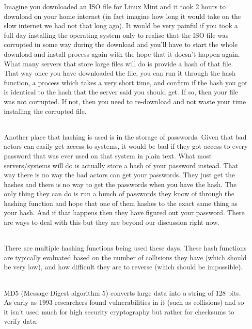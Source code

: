 \documentclass[
  letterpaper,
  DIV=11,
  numbers=noendperiod]{scrartcl}
\newenvironment{Shaded}{\begin{snugshade}}{\end{snugshade}}
\newcommand{\NormalTok}[1]{\textcolor[rgb]{0.00,0.23,0.31}{#1}}
\begin{document}
Imagine you downloaded an ISO file for Linux Mint and it took 2 hours to
download on your home internet (in fact imagine how long it would take
on the slow internet we had not that long ago). It would be very painful
if you took a full day installing the operating system only to realise
that the ISO file was corrupted in some way during the download and
you'll have to start the whole download and install process again with
the hope that it doesn't happen again. What many servers that store
large files will do is provide a hash of that file. That way once you
have downloaded the file, you can run it through the hash function, a
process which takes a very short time, and confirm if the hash you got
is identical to the hash that the server said you should get. If so,
then your file was not corrupted. If not, then you need to re-download
and not waste your time installing the corrupted file.\\
\strut \\
Another place that hashing is used is in the storage of passwords. Given
that bad actors can easily get access to systems, it would be bad if
they got access to every password that was ever used on that system in
plain text. What most servers/systems will do is actually store a hash
of your password instead. That way there is no way the bad actors can
get your passwords. They just get the hashes and there is no way to get
the passwords when you have the hash. The only thing they can do is run
a bunch of passwords they know of through the hashing function and hope
that one of them hashes to the exact same thing as your hash. And if
that happens then they have figured out your password. There are ways to
deal with this but they are beyond our discussion right now.\\
\strut \\
There are multiple hashing functions being used these days. These hash
functions are typically evaluated based on the number of collisions they
have (which should be very low), and how difficult they are to reverse
(which should be impossible).\\
\strut \\
MD5 (Message Digest algorithm 5) converts large data into a string of
128 bits. As early as 1993 researchers found vulnerabilities in it (such
as collisions) and so it isn't used much for high security cryptography
but rather for checksums to verify data.

\begin{Shaded}
\end{Shaded}
\end{document}
